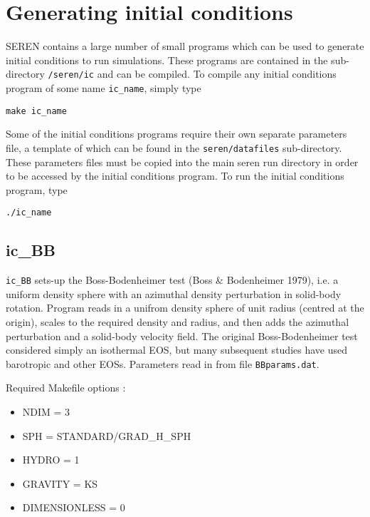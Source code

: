 \documentclass[a4paper]{article}
\newcommand{\var}[1]{\texttt{#1}}
\begin{document}
\newpage

\section{Generating initial conditions} \label{SS:ICS}
SEREN contains a large number of small programs which can be used to generate initial conditions to run simulations.  These programs are contained in the sub-directory \var{/seren/ic} and can be compiled.  To compile any initial conditions program of some name \var{ic\_name}, simply type \newline 

\var{make ic\_name} \newline

\noindent Some of the initial conditions programs require their own separate parameters file, a template of which can be found in the \var{seren/datafiles} sub-directory.  These parameters files must be copied into the main seren run directory in order to be accessed by the initial conditions program.  To run the initial conditions program, type \newline

\var{./ic\_name}


\subsection{ic\_BB}
\var{ic\_BB} sets-up the Boss-Bodenheimer test (Boss \& Bodenheimer 1979), i.e. a uniform density sphere with an azimuthal density perturbation in solid-body rotation.  Program reads in a unifrom density sphere of unit radius (centred at the origin), scales to the required density and radius, and then adds the azimuthal perturbation and a solid-body velocity field.  The original Boss-Bodenheimer test considered simply an isothermal EOS, but many subsequent studies have used barotropic and other EOSs.  Parameters read in from file \var{BBparams.dat}. \newline

\noindent Required Makefile options :
\begin{itemize}
\item NDIM = 3
\item SPH = STANDARD/GRAD\_H\_SPH
\item HYDRO = 1
\item GRAVITY = KS
\item DIMENSIONLESS = 0
\end{itemize}
\vspace{0.1cm}
\end{document}
